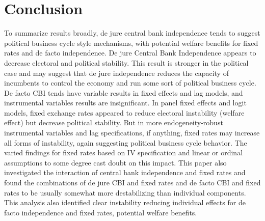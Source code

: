 \documentclass{article}
\begin{document}
    \section*{Conclusion}

    To summarize results broadly, de jure central bank independence tends to suggest political business cycle style mechanisms, with potential welfare benefits for fixed rates and de facto independence. De jure Central Bank Independence appears to decrease electoral and political stability. This result is stronger in the political case and may suggest that de jure independence reduces the capacity of incumbents to control the economy and run some sort of political business cycle. De facto CBI tends have variable results in fixed effects and lag models, and instrumental variables results are insignificant. In panel fixed effects and logit models, fixed exchange rates appeared to reduce electoral instability (welfare effect) but decrease political stability. But in more endogeneity-robust instrumental variables and lag specifications, if anything, fixed rates may increase all forms of instability, again suggesting political business cycle behavior. The varied findings for fixed rates based on IV specification and linear or ordinal assumptions to some degree cast doubt on this impact. This paper also investigated the interaction of central bank independence and fixed rates and found the combinations of de jure CBI and fixed rates and de facto CBI and fixed rates to be usually somewhat more destabilizing than individual components. This analysis also identified clear instability reducing individual effects for de facto independence and fixed rates, potential welfare benefits.
\end{document}
